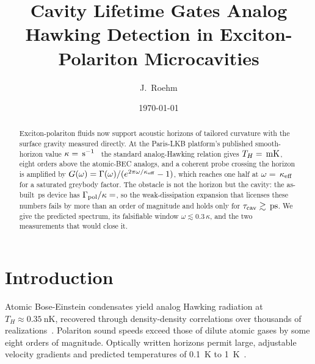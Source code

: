 \documentclass[aps,prl,twocolumn,superscriptaddress,nofootinbib]{revtex4-2}
\begin{document}
\title{Cavity Lifetime Gates Analog Hawking Detection in
Exciton-Polariton Microcavities}

\author{J.~Roehm}

\date{\today}

\begin{abstract}
Exciton-polariton fluids now support acoustic horizons of tailored
curvature with the surface gravity measured directly. At the
Paris-LKB platform's published smooth-horizon value
$\kappa = \unskip\,\mathrm{s}^{-1}$~\cite{Falque2025} the
standard analog-Hawking relation gives
$T_H = \unskip\,\si{\milli\kelvin}$, eight orders above the
atomic-BEC analogs, and a coherent probe crossing the horizon is
amplified by $G(\omega) = \Gamma(\omega)/(e^{2\pi\omega/\kappa_{\rm eff}}-1)$,
which reaches one half at
$\omega = \unskip\,\kappa_{\rm eff}$ for a
saturated greybody factor. The obstacle is not the horizon but the
cavity: the as-built \unskip\,\si{\pico\second}
device has $\Gamma_{\rm pol}/\kappa = \unskip$,
so the weak-dissipation expansion that licenses these numbers fails
by more than an order of magnitude and holds only for
$\tau_{\rm cav} \gtrsim \unskip\,\si{\pico\second}$.
We give the predicted spectrum, its falsifiable window
$\omega \lesssim 0.3\,\kappa$, and the two measurements that would
close it.
\end{abstract}

\maketitle

\section{Introduction}

Atomic Bose-Einstein condensates yield analog Hawking radiation at
$T_H \approx \SI{0.35}{\nano\kelvin}$, recovered through density-density
correlations over thousands of realizations~\cite{Steinhauer2016,deNova2019}.
Polariton sound speeds exceed those of dilute atomic gases by some eight
orders of magnitude. Optically written horizons permit large, adjustable
velocity gradients and predicted temperatures of
\SI{0.1}{\kelvin} to \SI{1}{\kelvin}~\cite{Gerace2012,Nguyen2015}.
\end{document}
